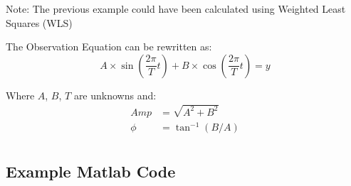 Note: The previous example could have been calculated using Weighted Least Squares (WLS)

The Observation Equation can be rewritten as:
\[
A \times \sin(\dfrac{2\pi}{T}t) + B \times \cos(\dfrac{2\pi}{T}t) = y
\]

Where $A$, $B$, $T$ are unknowns and:
\begin{align*}
	Amp &= \sqrt{A^2+B^2}\\
	\phi &= \tan^{-1}(B/A)\\
\end{align*}
\clearpage



\subsection{Example Matlab Code}



